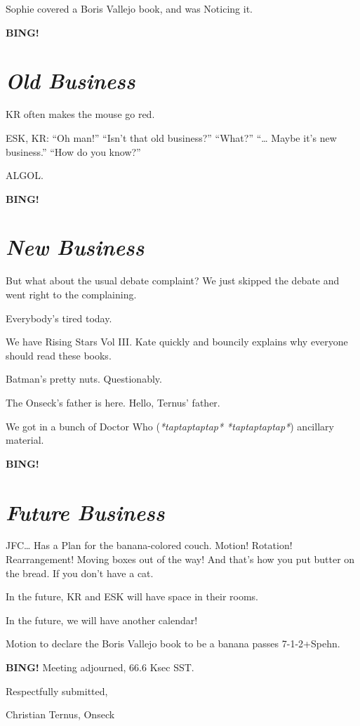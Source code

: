 \documentclass[10pt]{article}
\newcommand{\bing}{{\bf BING!} }
\newcommand{\goto}[1]{\bing \vskip 12pt \section*{{\em{#1}}}}
\begin{document}
Sophie covered a Boris Vallejo book, and was Noticing it.

\goto{Old Business}

KR often makes the mouse go red.

ESK, KR: ``Oh man!'' ``Isn't that old business?''  ``What?'' ``\ldots{} Maybe it's new business.''  ``How do you know?''


ALGOL.

\goto{New Business}

But what about the usual debate complaint?  We just skipped the debate and went right to the complaining.

Everybody's tired today.

We have Rising Stars Vol III.  Kate quickly and bouncily explains why everyone should read these books.

Batman's pretty nuts.  Questionably.

The Onseck's father is here.  Hello, Ternus' father.

We got in a bunch of Doctor Who (\emph{*taptaptaptap* *taptaptaptap*}) ancillary material.

\goto{Future Business}

JFC\ldots{} Has a Plan for the banana-colored couch.  Motion!  Rotation!  Rearrangement!  Moving boxes out of the way!  And that's how you put butter on the bread.  If you don't have a cat.

In the future, KR and ESK will have space in their rooms.

In the future, we will have another calendar!

Motion to declare the Boris Vallejo book to be a banana passes 7-1-2+Spehn.

\bing
\noindent
Meeting adjourned, 66.6 Ksec SST.

\vspace{18pt}

\centerline{Respectfully submitted,}
\centerline{Christian Ternus, Onseck}
\end{document}
